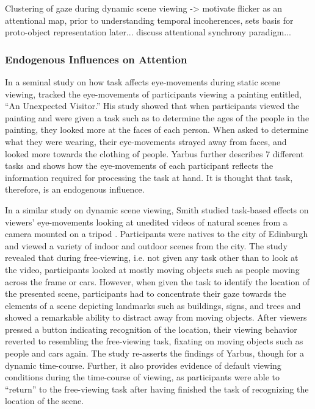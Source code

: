 Clustering of gaze during dynamic scene viewing -> motivate flicker as an attentional map, prior to understanding temporal incoherences, sets basis for proto-object representation later... discuss attentional synchrony paradigm... 
  	
\subsubsection{Endogenous Influences on Attention}
\label{sec:endogenous-influences}

In a seminal study on how task affects eye-movements during static scene viewing, \cite{Yarbus1967} tracked the eye-movements of participants viewing a painting entitled, ``An Unexpected Visitor.''  His study showed that when participants viewed the painting and were given a task such as to determine the ages of the people in the painting, they looked more at the faces of each person.  When asked to determine what they were wearing, their eye-movements strayed away from faces, and looked more towards the clothing of people.  Yarbus further describes 7 different tasks and shows how the eye-movements of each participant reflects the information required for processing the task at hand.  It is thought that task, therefore, is an endogenous influence.

In a similar study on dynamic scene viewing, Smith studied task-based effects on viewers' eye-movements looking at unedited videos of natural scenes from a camera mounted on a tripod \cite{Smith2011a}.  Participants were natives to the city of Edinburgh and viewed a variety of indoor and outdoor scenes from the city.  The study revealed that during free-viewing, i.e. not given any task other than to look at the video, participants looked at mostly moving objects such as people moving across the frame or cars.  However, when given the task to identify the location of the presented scene, participants had to concentrate their gaze towards the elements of a scene depicting landmarks such as buildings, signs, and trees and showed a remarkable ability to distract away from moving objects.  After viewers pressed a button indicating recognition of the location, their viewing behavior reverted to resembling the free-viewing task, fixating on moving objects such as people and cars again.  The study re-asserts the findings of Yarbus, though for a dynamic time-course.  Further, it also provides evidence of default viewing conditions during the time-course of viewing, as participants were able to ``return'' to the free-viewing task after having finished the task of recognizing the location of the scene.  


